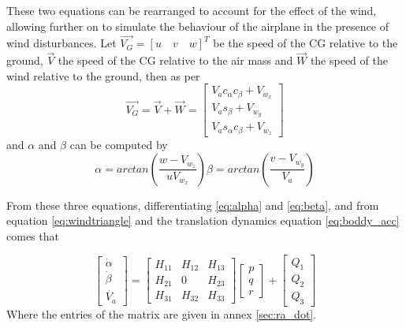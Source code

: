 These two equations can be rearranged to account for the effect of the wind, allowing further on to simulate the behaviour of the airplane in the presence of wind disturbances. Let $\vec{V_G} = [u \quad v \quad w]^T$ be the speed of the CG relative to the ground, $\vec{V}$ the speed of the CG relative to the air mass and $\vec{W}$ the speed of the wind relative to the ground, then as per \cite{Etkin+Reid} 
\begin{equation}
\vec{V_G} = \vec{V} + \vec{W} = 
\begin{bmatrix}
V_ac_\alpha c_\beta + V_{w_x}\\
V_as_\beta+V_{w_y}\\
V_as_\alpha c_\beta + V_{w_z}
\end{bmatrix}
\label{eq:windtriangle}
\end{equation}
and $\alpha$ and $\beta$ can be computed by 
\begin{subequations}
	\begin{equation}
		\alpha = arctan\left(\dfrac{w-V_{w_z}}{uV_{w_x}}\right)
		\label{eq:alpha}
	\end{equation}
	\begin{equation}
		\beta = arctan\left(\dfrac{v-V_{w_y}}{V_a}\right)
		\label{eq:beta}
	\end{equation}
\end{subequations}

From these three equations, differentiating \ref{eq:alpha} and \ref{eq:beta}, and from equation \ref{eq:windtriangle} and the translation dynamics equation \ref{eq:boddy_acc} comes that 

\begin{equation}
\begin{bmatrix}
\dot{\alpha}\\
\dot{\beta}\\
\dot{V_a}
\end{bmatrix}
= 
\begin{bmatrix}
H_{11} & H_{12} & H_{13}\\
H_{21} & 0 & H_{23}\\
H_{31} & H_{32} & H_{33}
\end{bmatrix}
\begin{bmatrix}
p\\
q\\
r
\end{bmatrix}
+
\begin{bmatrix}
Q_1\\
Q_2\\
Q_3
\end{bmatrix}
\label{eq:alphabetadot}
\end{equation}
Where the entries of the matrix are given in annex \ref{sec:ra_dot}.


